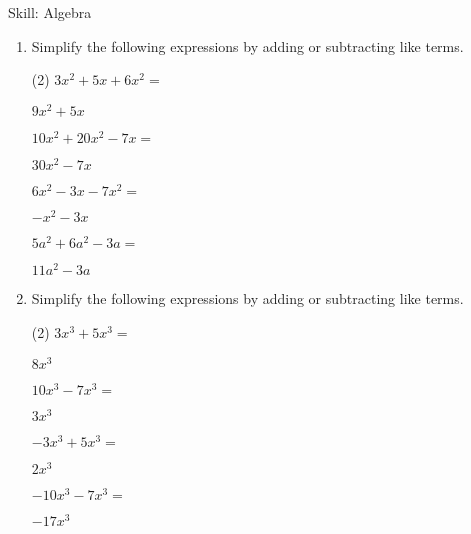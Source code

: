\begin{bxTip}[colbacktitle=bkcolor]{Skill: Algebra}
\begin{enumerate} [leftmargin=0cm]
\item Simplify the following expressions by adding or subtracting like terms.
\begin{tasks}[label=(\alph*), after-item-skip=2pt,after-skip=3pt, label-width=4ex](2)
    \task  $ 3x^2+5x+6x^2=           $                               \begin{envFillIn} $  9x^2 +5x        $ \end{envFillIn}
    \task  $ 10x^2+20x^2-7x=         $                               \begin{envFillIn} $  30x^2-7x        $ \end{envFillIn}
    \task  $ 6x^2-3x-7x^2=           $                               \begin{envFillIn} $  -x^2-3x         $ \end{envFillIn}
    \task  $ 5a^2+6a^2-3a=           $                               \begin{envFillIn} $  11a^2-3a        $ \end{envFillIn} 
\end{tasks}


\item Simplify the following expressions by adding or subtracting like terms.
\begin{tasks}[label=(\alph*), after-item-skip=2pt,after-skip=3pt, label-width=4ex](2)
    \task  $ 3x^3+5x^3=           $                               \begin{envFillIn} $  8x^3         $ \end{envFillIn}
    \task  $ 10x^3-7x^3=          $                               \begin{envFillIn} $  3x^3         $ \end{envFillIn}
    \task  $ -3x^3+5x^3=          $                               \begin{envFillIn} $  2x^3         $ \end{envFillIn}
    \task  $ -10x^3-7x^3=         $                               \begin{envFillIn} $  -17x^3       $ \end{envFillIn} 
\end{tasks}


\end{enumerate}
\end{bxTip}
